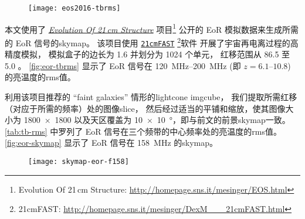 \begin{figure}[htp]
  \centering
  \texttt{[image: eos2016-tbrms]}
  \label{fig:eor-tbrms}
\end{figure}

本文使用了
\href{http://homepage.sns.it/mesinger/EOS.html}{\textit{Evolution Of 21\,cm Structure}}
项目\footnote{%
  Evolution Of 21\,cm Structure:
  \url{http://homepage.sns.it/mesinger/EOS.html}
} 公开的 EoR 模拟数据来生成所需的 EoR 信号的\ac{skymap}。
该项目使用
\href{http://homepage.sns.it/mesinger/DexM___21cmFAST.html}{\texttt{21cmFAST}}%
\footnote{%
  21cmFAST: \url{http://homepage.sns.it/mesinger/DexM___21cmFAST.html}
}软件\cite{mesinger2011}
开展了宇宙再电离过程的高精度模拟，
模拟盒子的边长为 \SI{1.6}{\Gpc} 并划分为 1024 个单元，
红移范围从 86.5 至 5.0 \cite{mesinger2016}。
\autoref{fig:eor-tbrms} 显示了 EoR 信号在 \SIrange{120}{200}{\MHz}
(即 $z = \numrange{6.1}{10.8}$) 的亮温度的\acs*{rms}值。

利用该项目推荐的 \enquote{faint galaxies} 情形的\ac{lightcone} \ac{imgcube}，
我们提取所需红移（对应于所需的频率）处的图像\ac{slice}，
然后经过适当的平铺和缩放，使其图像大小为 \num{1800 x 1800}
以及天区覆盖为 \SI{10 x 10}{\degree}，即与前文的前景\ac{skymap}一致。
\autoref{tab:tb-rms} 中罗列了 EoR 信号在三个频带的中心频率处的亮温度的\ac{rms}值。
\autoref{fig:eor-skymap} 显示了 EoR 信号在 \SI{158}{\MHz} 的\ac{skymap}。

\begin{figure}[htp]
  \centering
  \texttt{[image: skymap-eor-f158]}
  \label{fig:eor-skymap}
\end{figure}


